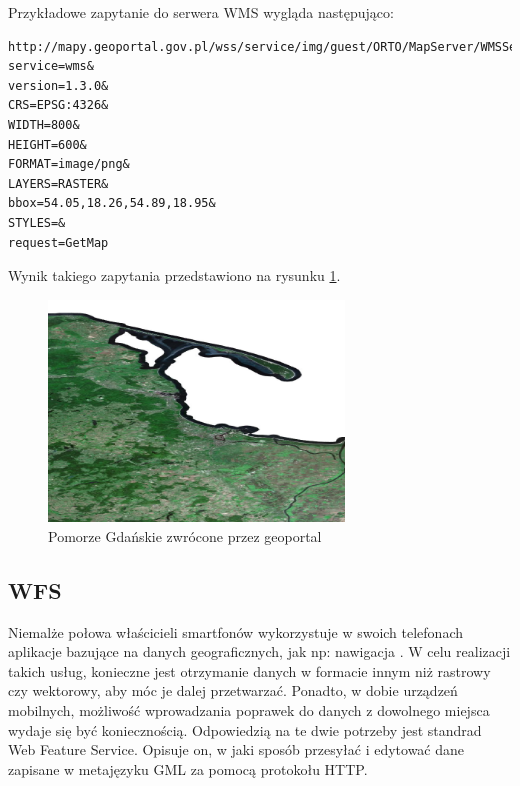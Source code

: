 Przykładowe zapytanie do serwera WMS wygląda następująco: 

\begin{lstlisting}[frame=L]
http://mapy.geoportal.gov.pl/wss/service/img/guest/ORTO/MapServer/WMSServer?
service=wms&
version=1.3.0&
CRS=EPSG:4326&
WIDTH=800&
HEIGHT=600&
FORMAT=image/png&
LAYERS=RASTER&
bbox=54.05,18.26,54.89,18.95&
STYLES=&
request=GetMap
\end{lstlisting}

Wynik takiego zapytania przedstawiono na rysunku \ref{fig:pomorze_gdanskie}.

\begin{figure}[h!]
    \centering
    \includegraphics[width=0.7\textwidth]{img/pomorze_gdanskie.png}
    \caption{Pomorze Gdańskie zwrócone przez geoportal}
    \label{fig:pomorze_gdanskie}
\end{figure}

\subsection{WFS}

Niemalże połowa właścicieli smartfonów wykorzystuje w swoich telefonach aplikacje bazujące na danych geograficznych, jak np: nawigacja \cite{duggan2013}.
W celu realizacji takich usług, konieczne jest otrzymanie danych w formacie innym niż rastrowy czy wektorowy, aby móc je dalej przetwarzać.
Ponadto, w dobie urządzeń mobilnych, możliwość wprowadzania poprawek do danych z dowolnego miejsca wydaje się być koniecznością.
Odpowiedzią na te dwie potrzeby jest standrad Web Feature Service.
Opisuje on, w jaki sposób przesyłać i edytować dane zapisane w metajęzyku GML za pomocą protokołu HTTP.

